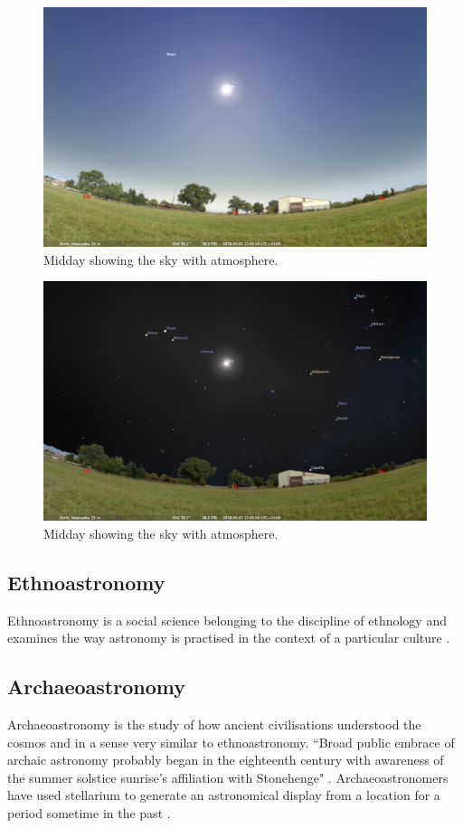 \begin{figure}[ht]
	\centerline{\includegraphics[width=1\columnwidth]{with-atmosphere.png}}
	\caption{\label{fig_with-atmosphere}{Midday showing the sky with atmosphere.}}
\end{figure}

\begin{figure}[ht]
	\centerline{\includegraphics[width=1\columnwidth]{no-atmosphere.png}}
	\caption{\label{fig_no-atmosphere}{Midday showing the sky with atmosphere.}}
\end{figure}


\subsection{Ethnoastronomy}
Ethnoastronomy is a social science belonging to the discipline of ethnology and examines the way astronomy is practised in the context of a particular culture \cite{Salt2015}.

\subsection{Archaeoastronomy}
Archaeoastronomy is the study of how ancient civilisations understood the cosmos and in a sense very similar to ethnoastronomy.
``Broad public embrace of archaic astronomy probably began in the eighteenth
century with awareness of the summer solstice sunrise’s affiliation with Stonehenge" \cite[p.~263]{Krupp2015}.
Archaeoastronomers have used stellarium to generate an astronomical display from a location for a period sometime in the past \cite{zotti2014towards}.

